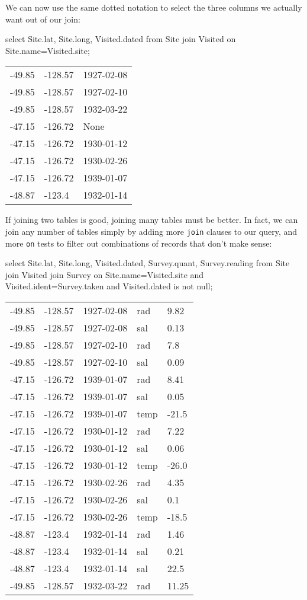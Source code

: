 \documentclass{book}
\begin{document}
We can now use the same dotted notation to select the three columns we
actually want out of our join:

\begin{VerbIn}
select Site.lat, Site.long, Visited.dated
from   Site join Visited
on     Site.name=Visited.site;
\end{VerbIn}

\begin{tabular}{lll}
-49.85 & -128.57 & 1927-02-08 \\
-49.85 & -128.57 & 1927-02-10 \\
-49.85 & -128.57 & 1932-03-22 \\
-47.15 & -126.72 & None \\
-47.15 & -126.72 & 1930-01-12 \\
-47.15 & -126.72 & 1930-02-26 \\
-47.15 & -126.72 & 1939-01-07 \\
-48.87 & -123.4 & 1932-01-14 \\
\end{tabular}

If joining two tables is good, joining many tables must be better. In
fact, we can join any number of tables simply by adding more
\texttt{join} clauses to our query, and more \texttt{on} tests to filter
out combinations of records that don't make sense:

\begin{VerbIn}
select Site.lat, Site.long, Visited.dated, Survey.quant, Survey.reading
from   Site join Visited join Survey
on     Site.name=Visited.site
and    Visited.ident=Survey.taken
and    Visited.dated is not null;
\end{VerbIn}

\begin{tabular}{lllll}
-49.85 & -128.57 & 1927-02-08 & rad & 9.82 \\
-49.85 & -128.57 & 1927-02-08 & sal & 0.13 \\
-49.85 & -128.57 & 1927-02-10 & rad & 7.8 \\
-49.85 & -128.57 & 1927-02-10 & sal & 0.09 \\
-47.15 & -126.72 & 1939-01-07 & rad & 8.41 \\
-47.15 & -126.72 & 1939-01-07 & sal & 0.05 \\
-47.15 & -126.72 & 1939-01-07 & temp & -21.5 \\
-47.15 & -126.72 & 1930-01-12 & rad & 7.22 \\
-47.15 & -126.72 & 1930-01-12 & sal & 0.06 \\
-47.15 & -126.72 & 1930-01-12 & temp & -26.0 \\
-47.15 & -126.72 & 1930-02-26 & rad & 4.35 \\
-47.15 & -126.72 & 1930-02-26 & sal & 0.1 \\
-47.15 & -126.72 & 1930-02-26 & temp & -18.5 \\
-48.87 & -123.4 & 1932-01-14 & rad & 1.46 \\
-48.87 & -123.4 & 1932-01-14 & sal & 0.21 \\
-48.87 & -123.4 & 1932-01-14 & sal & 22.5 \\
-49.85 & -128.57 & 1932-03-22 & rad & 11.25 \\
\end{tabular}
\end{document}
